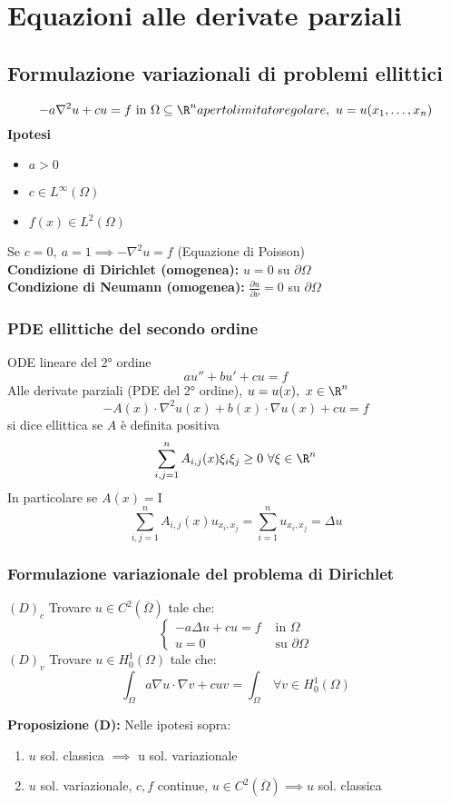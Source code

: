 \section{Equazioni alle derivate parziali}
\subsection{Formulazione variazionali di problemi ellittici}
\[-a\nabla ^2u+cu=f\text{ in }\Omega\subseteq  \R^n aperto limitato regolare,\ u=u(x_1,\ldots,x_n)\]
\textbf{Ipotesi}
\begin{itemize}
	\item $a>0$ 
	\item $c\in L^{\infty}(\Omega)$ 
	\item $f(x)\in L^{2}(\Omega)$
\end{itemize}
Se $c=0,\ a=1\implies -\nabla ^2 u=f$ (Equazione di Poisson)\\
\textbf{Condizione di Dirichlet (omogenea):} $u=0$ su $\partial\Omega$
\\\textbf{Condizione di Neumann (omogenea):} $\frac{\partial u}{\partial \nu} =0$ su $\partial\Omega$
\subsubsection{PDE ellittiche del secondo ordine}
ODE lineare del 2° ordine
\[au''+bu'+cu=f\]
Alle derivate parziali (PDE del 2° ordine), $u=u(x),\ x\in \R^n$
\[-A(x)\cdot \nabla ^2 u(x)+b(x)\cdot \nabla u(x)+cu=f\]
si dice ellittica se $A$ è definita positiva
\[\sum_{i,j=1}^{n} A_{i,j}(x)\xi_i\xi_j\ge 0\ \forall \xi \in \R^n\]
In particolare se $A(x)=\text{I}$ 
\[\sum_{i,j=1}^{n} A_{i,j}(x)u_{x_i,x_j}=\sum_{i=1}^{n} u_{x_i,x_j}=\Delta u\]
\subsubsection{Formulazione variazionale del problema di Dirichlet}
$(D)_c$ Trovare $u\in C^2(\overline\Omega)$ tale che:
\[\begin{cases}
	-a\Delta u+cu=f&\text{ in }\Omega
	\\u=0&\text{ su }\partial \Omega
\end{cases}\]
$(D)_v$ Trovare $u\in H_0^1(\Omega)$ tale che:
\[\int_{\Omega}^{} a\nabla u\cdot \nabla v+cuv=\int_{\Omega}^{} \ \forall v\in H_0^1(\Omega)\]
\begin{tcolorbox}
	\textbf{Proposizione (D):} Nelle ipotesi sopra:
	\begin{enumerate}
		\item $u$ sol. classica $\implies $ u sol. variazionale
		\item $u$ sol. variazionale, $c,f$ continue, $u\in C^2(\overline\Omega)\implies u$ sol. classica
	\end{enumerate}
\end{tcolorbox}

